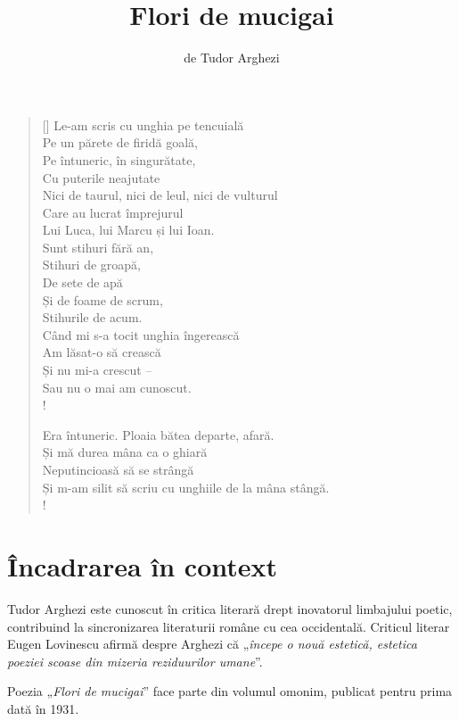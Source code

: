 \documentclass{article}
\title{Flori de mucigai}
\author{de Tudor Arghezi}
\date{}
\newcommand{\qu}[1]{„\emph{#1}”}
\begin{document}
\maketitle

\settowidth{\versewidth}{Și m-am silit să scriu cu unghiile de la mâna stângă.}
\begin{verse}[\versewidth]
Le-am scris cu unghia pe tencuială \\
Pe un părete de firidă goală, \\
Pe întuneric, în singurătate, \\
Cu puterile neajutate \\
Nici de taurul, nici de leul, nici de vulturul \\
Care au lucrat împrejurul \\
Lui Luca, lui Marcu și lui Ioan. \\
Sunt stihuri fără an, \\
Stihuri de groapă, \\
De sete de apă \\
Și de foame de scrum, \\
Stihurile de acum. \\
Când mi s-a tocit unghia îngerească \\
Am lăsat-o să crească \\
Și nu mi-a crescut -- \\
Sau nu o mai am cunoscut. \\!

Era întuneric. Ploaia bătea departe, afară. \\
Și mă durea mâna ca o ghiară \\
Neputincioasă să se strângă \\
Și m-am silit să scriu cu unghiile de la mâna stângă. \\!
\end{verse}

\section{Încadrarea în context}
Tudor Arghezi este cunoscut în critica literară drept inovatorul limbajului poetic, contribuind la sincronizarea literaturii române cu cea occidentală. Criticul literar Eugen Lovinescu afirmă despre Arghezi că \qu{începe o nouă estetică, estetica poeziei scoase din mizeria reziduurilor umane}.

Poezia \qu{Flori de mucigai} face parte din volumul omonim, publicat pentru prima dată în 1931.
\end{document}
